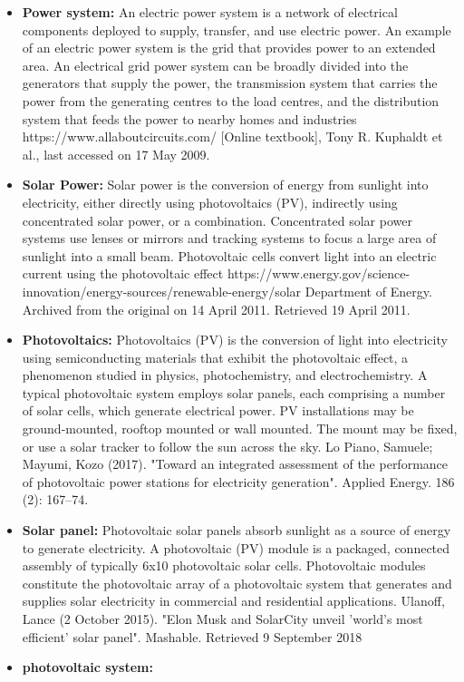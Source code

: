 \begin{itemize}
        \item \textbf{Power system:} An electric power system is a network of electrical components deployed to supply, transfer, and use electric power. An example of an electric power system is the grid that provides power to an extended area. An electrical grid power system can be broadly divided into the generators that supply the power, the transmission system that carries the power from the generating centres to the load centres, and the distribution system that feeds the power to nearby homes and industries
        https://www.allaboutcircuits.com/  [Online textbook], Tony R. Kuphaldt et al., last accessed on 17 May 2009.

        \item \textbf{Solar Power:} Solar power is the conversion of energy from sunlight into electricity, either directly using photovoltaics (PV), indirectly using concentrated solar power, or a combination. Concentrated solar power systems use lenses or mirrors and tracking systems to focus a large area of sunlight into a small beam. Photovoltaic cells convert light into an electric current using the photovoltaic effect
        https://www.energy.gov/science-innovation/energy-sources/renewable-energy/solar  Department of Energy. Archived from the original on 14 April 2011. Retrieved 19 April 2011.

        \item \textbf{Photovoltaics:} Photovoltaics (PV) is the conversion of light into electricity using semiconducting materials that exhibit the photovoltaic effect, a phenomenon studied in physics, photochemistry, and electrochemistry. A typical photovoltaic system employs solar panels, each comprising a number of solar cells, which generate electrical power. PV installations may be ground-mounted, rooftop mounted or wall mounted. The mount may be fixed, or use a solar tracker to follow the sun across the sky.
        Lo Piano, Samuele; Mayumi, Kozo (2017). "Toward an integrated assessment of the performance of photovoltaic power stations for electricity generation". Applied Energy. 186 (2): 167–74.

        \item \textbf{Solar panel:} Photovoltaic solar panels absorb sunlight as a source of energy to generate electricity. A photovoltaic (PV) module is a packaged, connected assembly of typically 6x10 photovoltaic solar cells. Photovoltaic modules constitute the photovoltaic array of a photovoltaic system that generates and supplies solar electricity in commercial and residential applications.
        Ulanoff, Lance (2 October 2015). "Elon Musk and SolarCity unveil 'world's most efficient' solar panel". Mashable. Retrieved 9 September 2018
        
        \item \textbf{photovoltaic system:}
    \end{itemize}



